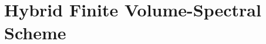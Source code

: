 


\graphicspath{{2/figures/}}

\section{Hybrid Finite Volume-Spectral Scheme}\label{sec:hybrid fv-spectral}

